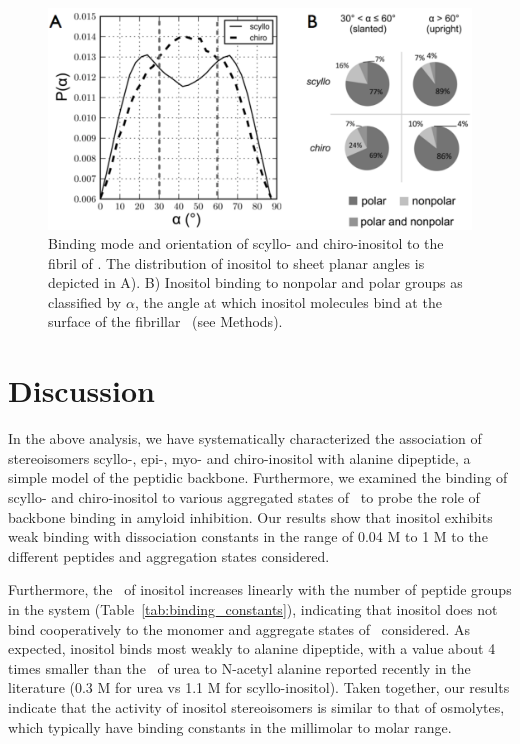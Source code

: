 \begin{figure}[htbp]
  \centering
  \includegraphics[width=6in]{figures/results1/GA4_paper_figures_submitted-8-rearranged}
  \caption[Binding mode and orientation of scyllo- and chiro-inositol to the fibril of \gafour.]{Binding mode and orientation of scyllo- and chiro-inositol to the fibril of \gafour. The distribution of inositol to sheet planar angles is depicted in A). B) Inositol binding to nonpolar and polar groups as classified by $\alpha$, the angle at which inositol molecules bind at the surface of the fibrillar \gafour\ (see Methods).}
   \label{fig:figure8}
\end{figure}

\section{Discussion}
In the above analysis, we have systematically characterized the association of stereoisomers scyllo-, epi-, myo- and chiro-inositol with alanine dipeptide, a simple model of the peptidic backbone. Furthermore, we examined the binding of scyllo- and chiro-inositol to various aggregated states of \gafour\ to probe the role of backbone binding in amyloid inhibition. Our results show that inositol exhibits weak binding with dissociation constants in the range of 0.04 M to 1 M to the different peptides and aggregation states considered.

Furthermore, the \KD\ of inositol increases linearly with the number of peptide groups in the system (Table~\ref{tab:binding_constants}), indicating that inositol does not bind cooperatively to the monomer and aggregate states of \gafour\ considered. As expected, inositol binds most weakly to alanine dipeptide, with a value about 4 times smaller than the \KD\ of urea to N-acetyl alanine reported recently in the literature (0.3 M for urea\cite{Lee:2010p59} vs 1.1 M for scyllo-inositol). Taken together, our results indicate that the activity of inositol stereoisomers is similar to that of osmolytes, which typically have binding constants in the millimolar to molar range.\cite{Rosgen:2007p90,Street:2006p21}

